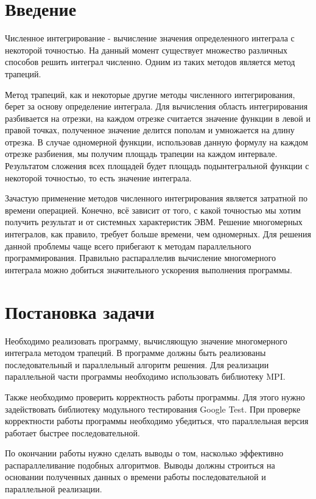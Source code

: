 \documentclass{report}
\begin{document}
\setcounter{page}{2}

\tableofcontents
\newpage

\section*{Введение}
\par Численное интегрирование - вычисление значения определенного интеграла с некоторой точностью. На данный момент существует множество различных способов решить интеграл численно. Одним из таких методов является метод трапеций.
\par Метод трапеций, как и некоторые другие методы численного интегрирования, берет за основу определение интеграла. Для вычисления область интегрирования разбивается на отрезки, на каждом отрезке считается значение функции в левой и правой точках, полученное значение делится пополам и умножается на длину отрезка. В случае одномерной функции, использовав данную формулу на каждом отрезке разбиения, мы получим площадь трапеции на каждом интервале. Результатом сложения всех площадей будет площадь подынтегральной функции с некоторой точностью, то есть значение интеграла.
\par Зачастую применение методов численного интегрирования является затратной по времени операцией. Конечно, всё зависит от того, с какой точностью мы хотим получить результат и от системных характеристик ЭВМ. Решение многомерных интегралов, как правило, требует больше времени, чем одномерных. Для решения данной проблемы чаще всего прибегают к методам параллельного программирования. Правильно распараллелив вычисление многомерного интеграла можно добиться значительного ускорения выполнения программы.
\newpage

\section*{Постановка задачи}
\par Необходимо реализовать программу, вычисляющую значение многомерного интеграла методом трапеций. В программе должны быть реализованы последовательный и параллельный алгоритм решения. Для реализации параллельной части программы необходимо использовать библиотеку MPI.
\par Также необходимо проверить корректность работы программы. Для этого нужно задействовать библиотеку модульного тестирования Google Test. При проверке корректности работы программы необходимо убедиться, что параллельная версия работает быстрее последовательной.
\par По окончании работы нужно сделать выводы о том, насколько эффективно распараллеливание подобных алгоритмов. Выводы должны строиться на основании полученных данных о времени работы последовательной и параллельной реализации.
\newpage
\end{document}
